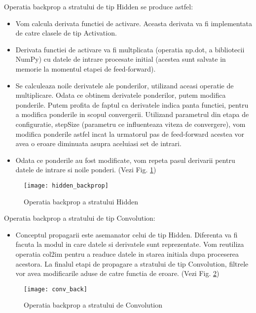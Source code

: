 	
	Operatia backprop a stratului de tip Hidden se produce astfel:
	\begin{itemize}
	\item	Vom calcula derivata functiei de activare. Aceasta derivata va fi implementata de catre clasele de tip Activation.
	
	\item	Derivata functiei de activare va fi multplicata (operatia np.dot, a bibliotecii NumPy) cu datele de intrare procesate initial (acestea sunt salvate in memorie la momentul etapei de feed-forward).
	
	
	\item	Se calculeaza noile derivatele ale ponderilor, utilizand aceasi operatie de multiplicare. Odata ce obtinem derivatele ponderilor, putem modifica ponderile. Putem profita de faptul ca derivatele indica panta functiei, pentru a modifica ponderile in scopul convergerii. Utilizand parametrul din etapa de configuratie, stepSize (parametru ce influenteaza viteza de convergere), vom modifica ponderile astfel incat la urmatorul pas de feed-forward acestea vor avea o eroare diminuata asupra aceluiasi set de intrari.
	
	\item	Odata ce ponderile au fost modificate, vom repeta pasul derivarii pentru datele de intrare si noile ponderi. (Vezi Fig. \ref{fig:hidden_backprop})
	\end{itemize}

	\begin{figure}[H]
	\texttt{[image: hidden\_backprop]}
	\caption{\label{fig:hidden_backprop} Operatia backprop a stratului Hidden}
	\end{figure}

	Operatia backprop a stratului de tip Convolution:
	\begin{itemize}
	\item	Conceptul propagarii este asemanator celui de tip Hidden. Diferenta va fi facuta la modul in care datele si derivatele sunt reprezentate. Vom reutiliza operatia col2im pentru a readuce datele in starea initiala dupa proceserea acestora.
	La finalul etapi de propagare a stratului de tip Convolution, filtrele vor avea modificarile aduse de catre functia de eroare. (Vezi Fig. \ref{fig:conv_backprop})
	\end{itemize}

	\begin{figure}[H]
	\texttt{[image: conv\_back]}
	\caption{\label{fig:conv_backprop} Operatia backprop a stratului de Convolution}
	\end{figure}


